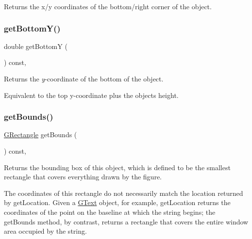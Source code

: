 Returns the x/y coordinates of the bottom/right corner of the object. 

\mbox{\label{classsgl_1_1GObject_a4316a2406c18e1c6d061fe51fd355490}} 
\subsubsection{\texorpdfstring{get\+Bottom\+Y()}{getBottomY()}}
{\footnotesize\ttfamily double get\+BottomY (\begin{DoxyParamCaption}{ }\end{DoxyParamCaption}) const\hspace{0.3cm}{\ttfamily [virtual]}, {\ttfamily [inherited]}}



Returns the {\itshape y}-\/coordinate of the bottom of the object. 

Equivalent to the top y-\/coordinate plus the object\textquotesingle{}s height. \mbox{\label{classsgl_1_1GObject_a29e6ac35a0b48f491a4c88194cc5da3b}} 
\subsubsection{\texorpdfstring{get\+Bounds()}{getBounds()}}
{\footnotesize\ttfamily \mbox{\hyperlink{structsgl_1_1GRectangle}{G\+Rectangle}} get\+Bounds (\begin{DoxyParamCaption}{ }\end{DoxyParamCaption}) const\hspace{0.3cm}{\ttfamily [virtual]}, {\ttfamily [inherited]}}



Returns the bounding box of this object, which is defined to be the smallest rectangle that covers everything drawn by the figure. 

The coordinates of this rectangle do not necessarily match the location returned by {\ttfamily get\+Location}. Given a {\ttfamily \mbox{\hyperlink{classsgl_1_1GText}{G\+Text}}} object, for example, {\ttfamily get\+Location} returns the coordinates of the point on the baseline at which the string begins; the {\ttfamily get\+Bounds} method, by contrast, returns a rectangle that covers the entire window area occupied by the string. 

